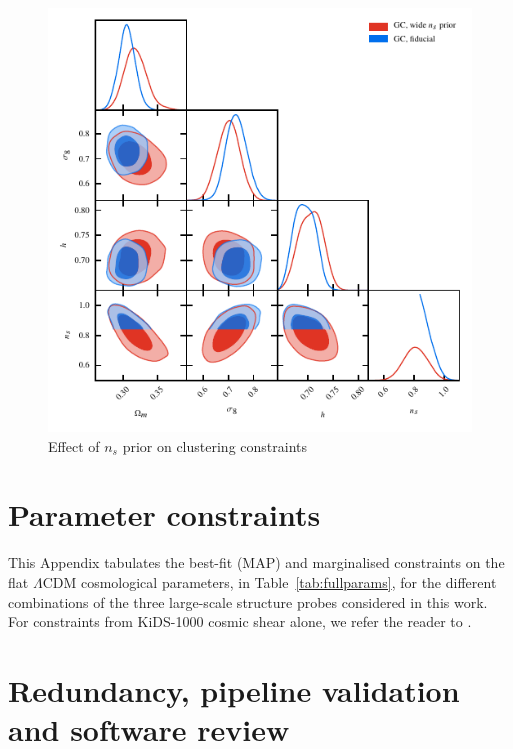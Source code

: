 \begin{appendix}
\begin{figure}
	\begin{center}
		\includegraphics[width=\columnwidth]{Parameter_Plots/systematics/GC_ns_prior}
		\caption{Effect of $n_{s}$ prior on clustering constraints}
		\label{fig:ns-prior}
	\end{center}
\end{figure}


\section{Parameter constraints}
\label{app:parameter-constraints}
This Appendix tabulates the best-fit (MAP) and marginalised constraints on the flat $\Lambda$CDM cosmological parameters, in Table~\ref{tab:fullparams}, for the different combinations of the three large-scale structure probes considered in this work.   For constraints from KiDS-1000 cosmic shear alone, we refer the reader to \citet{asgari/etal:inprep}.



\section{Redundancy, pipeline validation and software review}
\label{app:codereview}


\end{appendix}
